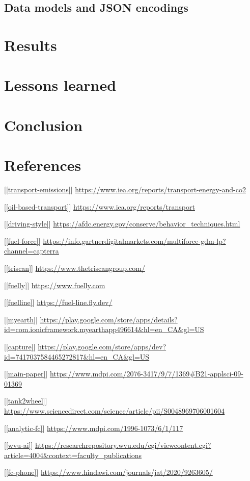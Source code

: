 \documentclass[11pt, oneside]{article}
\newcommand{\refinit}[1]{\noindent \hangindent=0.6cm [\ref{#1}]}  %
\begin{document}
\subsection{Data models and JSON encodings}

\section{Results}

\section{Lessons learned}

\section{Conclusion}
 
 
\section{References}

\begin{small}

\refinit{transport-emissions} \url{https://www.iea.org/reports/transport-energy-and-co2}

\refinit{oil-based-transport} \url{https://www.iea.org/reports/transport}

\refinit{driving-style} \url{https://afdc.energy.gov/conserve/behavior_techniques.html}

\refinit{fuel-force} \url{https://info.gartnerdigitalmarkets.com/multiforce-gdm-lp?channel=capterra}

\refinit{triscan} \url{https://www.thetriscangroup.com/}

\refinit{fuelly} \url{https://www.fuelly.com}

\refinit{fuelline} \url{https://fuel-line.fly.dev/}

\refinit{myearth} \url{https://play.google.com/store/apps/details?id=com.ionicframework.myearthapp496614&hl=en_CA&gl=US}

\refinit{capture} \url{https://play.google.com/store/apps/dev?id=7417037584465272817&hl=en_CA&gl=US}

\refinit{main-paper}  \url{https://www.mdpi.com/2076-3417/9/7/1369#B21-applsci-09-01369}

\refinit{tank2wheel} \url{https://www.sciencedirect.com/science/article/pii/S0048969706001604}

\refinit{analytic-fc} \url{https://www.mdpi.com/1996-1073/6/1/117}

\refinit{wvu-ai} \url{https://researchrepository.wvu.edu/cgi/viewcontent.cgi?article=4004&context=faculty_publications}

\refinit{fc-phone} \url{https://www.hindawi.com/journals/jat/2020/9263605/}


\end{small}
\end{document}
